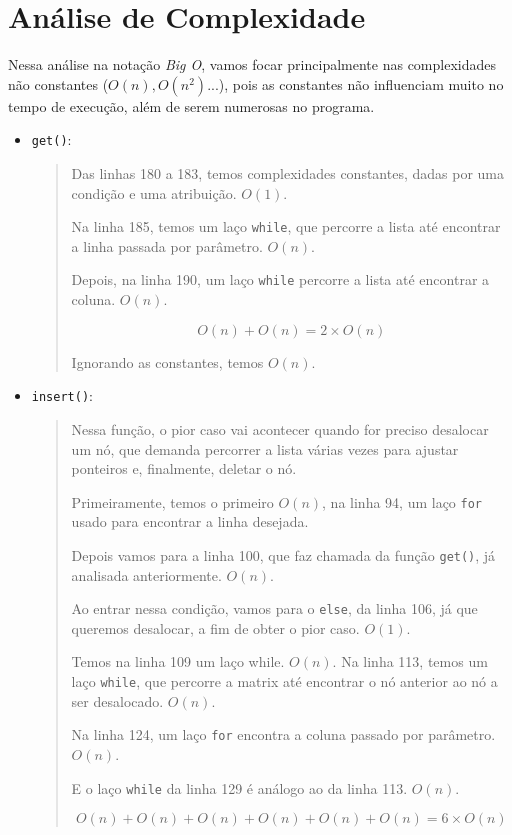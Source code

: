 \documentclass[12pt, letterpaper]{article}
\begin{document}
			\section{Análise de Complexidade} \label{complx}
			Nessa análise na notação \emph{Big O}, vamos focar principalmente nas complexidades não constantes ($O(n), O(n^2)$...), pois as constantes não influenciam muito no tempo de execução, além de serem numerosas no programa.
			\begin{itemize}
				\item \verb|get()|:
					\begin{quote}
						Das linhas 180 a 183, temos complexidades constantes, dadas por uma condição e uma atribuição. $O(1)$.

						Na linha 185, temos um laço \verb|while|, que percorre a lista até encontrar a linha passada por parâmetro. $O(n)$.

						Depois, na linha 190, um laço \verb|while| percorre a lista até encontrar a coluna. $O(n)$.

						\[O(n) + O(n) = 2 \times O(n)\]

						Ignorando as constantes, temos $O(n)$.
					\end{quote}

				\item \verb|insert()|:
					\begin{quote}
						Nessa função, o pior caso vai acontecer quando for preciso desalocar um nó, que demanda percorrer a lista várias vezes para ajustar ponteiros e, finalmente, deletar o nó.

						Primeiramente, temos o primeiro $O(n)$, na linha 94, um laço \verb|for| usado para encontrar a linha desejada.

						Depois vamos para a linha 100, que faz chamada da função \verb|get()|, já analisada anteriormente. $O(n)$.

						Ao entrar nessa condição, vamos para o \verb|else|, da linha 106, já que queremos desalocar, a fim de obter o pior caso. $O(1)$.

						Temos na linha 109 um laço while. $O(n)$.
						Na linha 113, temos um laço \verb|while|, que percorre a matrix até encontrar o nó anterior ao nó a ser desalocado. $O(n)$.

						Na linha 124, um laço \verb|for| encontra a coluna passado por parâmetro. $O(n)$.

						E o laço \verb|while| da linha 129 é análogo ao da linha 113. $O(n)$.

						\[O(n) + O(n) + O(n) + O(n) + O(n) + O(n) = 6 \times O(n)\]


\end{quote}
\end{itemize}
\end{document}
